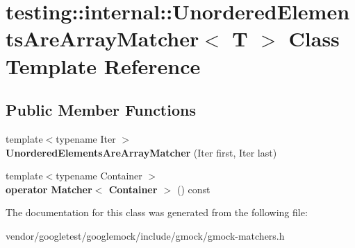 \hypertarget{classtesting_1_1internal_1_1_unordered_elements_are_array_matcher}{}\section{testing\+:\+:internal\+:\+:Unordered\+Elements\+Are\+Array\+Matcher$<$ T $>$ Class Template Reference}
\label{classtesting_1_1internal_1_1_unordered_elements_are_array_matcher}
\subsection*{Public Member Functions}
\begin{DoxyCompactItemize}
\item 
\mbox{\label{classtesting_1_1internal_1_1_unordered_elements_are_array_matcher_a5a91694cf5088cb0b7f4b1bb57dee957}} 
{\footnotesize template$<$typename Iter $>$ }\\{\bfseries Unordered\+Elements\+Are\+Array\+Matcher} (Iter first, Iter last)
\item 
\mbox{\label{classtesting_1_1internal_1_1_unordered_elements_are_array_matcher_ab09b91c39147c51f9c970fd155f2da77}} 
{\footnotesize template$<$typename Container $>$ }\\{\bfseries operator Matcher$<$ Container $>$} () const
\end{DoxyCompactItemize}


The documentation for this class was generated from the following file\+:\begin{DoxyCompactItemize}
\item 
vendor/googletest/googlemock/include/gmock/gmock-\/matchers.\+h\end{DoxyCompactItemize}

